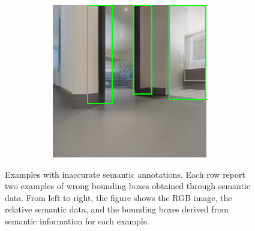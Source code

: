 \begin{figure}[h!]
\begin{subfigure}[b]{\linewidth}
\begin{subfigure}[b]{0.32\linewidth}
		\end{subfigure}
		\hfil
		\begin{subfigure}[b]{0.32\linewidth}
			\includegraphics[width=\textwidth]{images/wrong_box_box_2.png}
		\end{subfigure}
		\caption{}
		\label{fig:wrong_box_2}
	\end{subfigure}

	\caption{Examples with inaccurate semantic annotations. Each row report two examples of wrong bounding boxes obtained through semantic data. From left to right, the figure shows the RGB image, the relative semantic data, and the bounding boxes derived from semantic information for each example.}
	\label{fig:wrong_box}
\end{figure}

